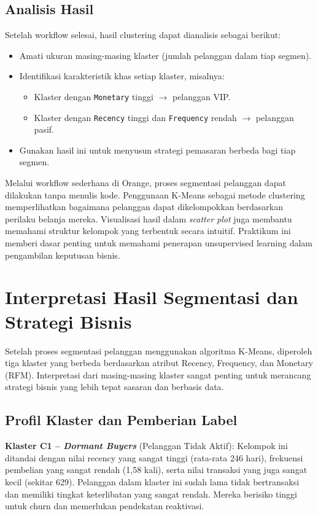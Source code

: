\subsection*{Analisis Hasil}

Setelah workflow selesai, hasil clustering dapat dianalisis sebagai berikut:

\begin{itemize}
	\item Amati ukuran masing-masing klaster (jumlah pelanggan dalam tiap segmen).
	\item Identifikasi karakteristik khas setiap klaster, misalnya:
	\begin{itemize}
		\item Klaster dengan \texttt{Monetary} tinggi $\rightarrow$ pelanggan VIP.
		\item Klaster dengan \texttt{Recency} tinggi dan \texttt{Frequency} rendah $\rightarrow$ pelanggan pasif.
	\end{itemize}
	\item Gunakan hasil ini untuk menyusun strategi pemasaran berbeda bagi tiap segmen.
\end{itemize}

Melalui workflow sederhana di Orange, proses segmentasi pelanggan dapat dilakukan tanpa menulis kode. Penggunaan K-Means sebagai metode clustering memperlihatkan bagaimana pelanggan dapat dikelompokkan berdasarkan perilaku belanja mereka. Visualisasi hasil dalam \textit{scatter plot} juga membantu memahami struktur kelompok yang terbentuk secara intuitif. Praktikum ini memberi dasar penting untuk memahami penerapan unsupervised learning dalam pengambilan keputusan bisnis.


\section{Interpretasi Hasil Segmentasi dan Strategi Bisnis}

Setelah proses segmentasi pelanggan menggunakan algoritma K-Means, diperoleh tiga klaster yang berbeda berdasarkan atribut Recency, Frequency, dan Monetary (RFM). Interpretasi dari masing-masing klaster sangat penting untuk merancang strategi bisnis yang lebih tepat sasaran dan berbasis data.

\subsection{Profil Klaster dan Pemberian Label}

\textbf{Klaster C1 – \textit{Dormant Buyers}} (Pelanggan Tidak Aktif):  
Kelompok ini ditandai dengan nilai recency yang sangat tinggi (rata-rata 246 hari), frekuensi pembelian yang sangat rendah (1,58 kali), serta nilai transaksi yang juga sangat kecil (sekitar 629). Pelanggan dalam klaster ini sudah lama tidak bertransaksi dan memiliki tingkat keterlibatan yang sangat rendah. Mereka berisiko tinggi untuk churn dan memerlukan pendekatan reaktivasi.

